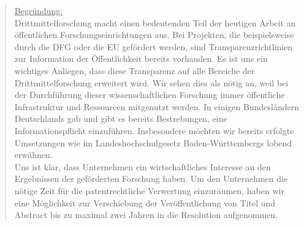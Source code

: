 \documentclass[10pt,oneside]{scrartcl}
\begin{document}
\begin{quote}
\underline{Begründung:}\\
Drittmittelforschung macht einen bedeutenden Teil der heutigen Arbeit an öffentlichen Forschungseinrichtungen aus. Bei Projekten, die beispielsweise durch die DFG oder die EU gefördert werden, sind Transparenzrichtlinien zur Information der Öffentlichkeit bereits vorhanden. Es ist uns ein wichtiges Anliegen, dass diese Transparenz auf alle Bereiche der Drittmittelforschung erweitert wird. Wir sehen dies als nötig an, weil bei der Durchführung dieser wissenschaftlichen Forschung immer öffentliche Infrastruktur und Ressourcen mitgenutzt werden. In einigen Bundesländern Deutschlands gab und gibt es bereits Bestrebungen, eine Informationspflicht einzuführen. Insbesondere möchten wir bereits erfolgte Umsetzungen wie im Landeshochschulgesetz Baden-Württembergs lobend erwähnen.\\
Uns ist klar, dass Unternehmen ein wirtschaftliches Interesse an den Ergebnissen der geförderten Forschung haben. Um den Unternehmen die nötige Zeit für die patentrechtliche Verwertung einzuräumen, haben wir eine Möglichkeit zur Verschiebung der Veröffentlichung von Titel und Abstract bis zu maximal zwei Jahren in die Resolution aufgenommen.

\end{quote}
\end{document}
